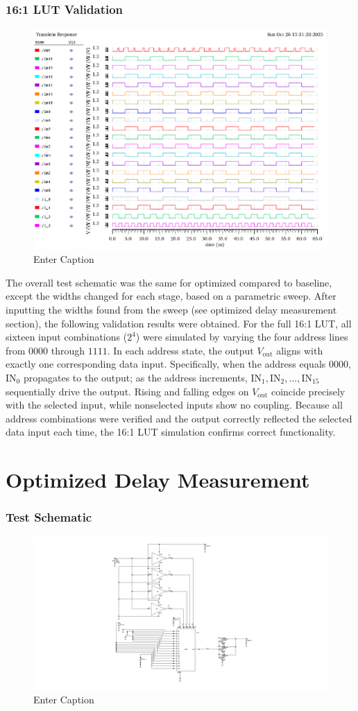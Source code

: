 \documentclass[12pt]{article}
\begin{document}
\subsubsection*{16:1 LUT Validation}
\begin{figure}[H]
    \centering
    \includegraphics[width=0.5\linewidth]{writeup//figures/lut_opt_validation_sim_updated.png}
    \caption{Enter Caption}
\end{figure}
The overall test schematic was the same for optimized compared to baseline, except the widths changed for each stage, based on a parametric sweep. After inputting the widths found from the sweep (see optimized delay measurement section), the following validation results were obtained.  For the full 16:1 LUT, all sixteen input combinations (\(2^4\)) were simulated by varying the four address lines from \(0000\) through \(1111\). 
In each address state, the output \(V_{\text{out}}\) aligns with exactly one corresponding data input. 
Specifically, when the address equals \(0000\), \(\text{IN}_0\) propagates to the output; as the address increments, \(\text{IN}_1, \text{IN}_2, \ldots, \text{IN}_{15}\) sequentially drive the output. 
Rising and falling edges on \(V_{\text{out}}\) coincide precisely with the selected input, while nonselected inputs show no coupling. 
Because all address combinations were verified and the output correctly reflected the selected data input each time, the 16:1 LUT simulation confirms correct functionality.

\newpage
\section{Optimized Delay Measurement}
\subsubsection{Test Schematic}
\begin{figure}[H]
    \centering
    \includegraphics[width=0.5\linewidth]{writeup//figures/updated_delay_opt_testschem.png}
    \caption{Enter Caption}
\end{figure}
\end{document}
